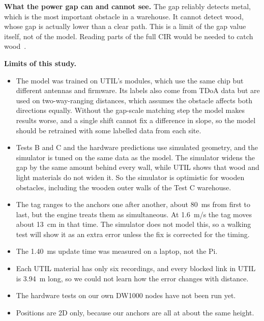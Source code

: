 \documentclass[conference]{IEEEtran}
\begin{document}
\textbf{What the power gap can and cannot see.} The gap reliably detects
metal, which is the most important obstacle in a warehouse. It cannot
detect wood, whose gap is actually lower than a clear path. This is a limit
of the gap value itself, not of the model. Reading parts of the full CIR
would be needed to catch wood~\cite{stahlke2020nlos,marano2010nlos}.

\textbf{Limits of this study.}
\begin{itemize}
    \item The model was trained on UTIL's modules, which use the same chip
    but different antennas and firmware. Its labels also come from TDoA
    data but are used on two-way-ranging distances, which assumes the
    obstacle affects both directions equally. Without the gap-scale
    matching step the model makes results worse, and a single shift cannot
    fix a difference in slope, so the model should be retrained with some
    labelled data from each site.
    \item Tests B and C and the hardware predictions use simulated geometry,
    and the simulator is tuned on the same data as the model. The simulator
    widens the gap by the same amount behind every wall, while UTIL shows
    that wood and light materials do not widen it. So the simulator is
    optimistic for wooden obstacles, including the wooden outer walls of
    the Test C warehouse.
    \item The tag ranges to the anchors one after another, about 80~ms from
    first to last, but the engine treats them as simultaneous. At 1.6~m/s
    the tag moves about 13~cm in that time. The simulator does not model
    this, so a walking test will show it as an extra error unless the fix
    is corrected for the timing.
    \item The 1.40~ms update time was measured on a laptop, not the Pi.
    \item Each UTIL material has only six recordings, and every blocked
    link in UTIL is 3.94~m long, so we could not learn how the error
    changes with distance.
    \item The hardware tests on our own DW1000 nodes have not been run yet.
    \item Positions are 2D only, because our anchors are all at about the
    same height.
\end{itemize}
\end{document}
